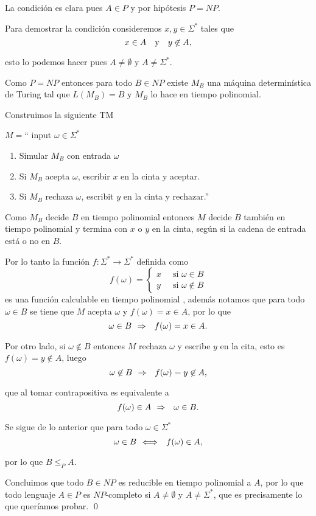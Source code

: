 \documentclass{article}
\begin{document}
La condición  es clara pues $A\in P$ y por hipótesis $P=NP$.

Para demostrar la condición  consideremos $x,y\in\Sigma^*$ tales que 
\[
    x\in A\quad\mbox{y}\quad y\not\in A,
\]

esto lo podemos hacer pues $A\neq\emptyset$ y $A\neq \Sigma^*$.

Como $P=NP$ entonces para todo $B\in NP$ existe $M_B$ una máquina determinística de Turing tal que $L(M_B)=B$ y $M_B$ lo hace en tiempo polinomial. 

Construimos la siguiente TM 

$M=$`` input $\omega\in \Sigma^*$
\begin{enumerate}
    \item Simular $M_B$ con entrada $\omega$
    \item Si $M_B$ acepta $\omega$, escribir $x$ en la cinta y aceptar.
    \item Si $M_B$ rechaza $\omega$, escribit $y$ en la cinta y rechazar.''
\end{enumerate}

Como $M_B$ decide $B$ en tiempo polinomial entonces $M$ decide $B$ también en tiempo polinomial y termina con $x$ o $y$ en la cinta, según si la cadena de entrada está o no en $B$.

Por lo tanto la función $f:\Sigma^*\rightarrow\Sigma^*$ definida como 
\[
    f(\omega)=\left\lbrace\begin{matrix}
        x&\ \text{ si }\omega\in B\\ 
        y&\ \text{ si }\omega\not\in B
    \end{matrix}\right.
\]
es una función calculable en tiempo polinomial \parencite[Ver][Definición 7.28]{sipser}, además notamos que para todo $\omega\in B$ se tiene que $M$ acepta $\omega$ y $f(\omega)=x\in A$, por lo que 
\[
    \omega\in B\mbox{$\ \ \Rightarrow\ \ $ } f(\omega)=x\in A.
\]

Por otro lado, si $\omega\not\in B$ entonces $M$ rechaza $\omega$ y escribe $y$ en la cita, esto es $f(\omega)=y\not\in A$, luego 
\[
    \omega\not\in B\mbox{$\ \ \Rightarrow\ \ $ } f(\omega)=y\not\in A,
\]

que al tomar contrapositiva es equivalente a
\[
    f(\omega)\in A\mbox{$\ \ \Rightarrow\ \ $ } \omega\in B.    
\]

Se sigue de lo anterior que para todo $\omega\in\Sigma^*$ 
\[
    \omega\in B\mbox{$\ \ \Longleftrightarrow\ \ $ } f(\omega)\in A,
\]

por lo que $B\leq_P A$. 

Concluimos que todo $B\in NP$ es reducible en tiempo polinomial a $A$, por lo que todo lenguaje $A\in P$ es $NP$-completo si $A\neq \emptyset$ y $A\neq \Sigma^*$, que es precisamente lo que queríamos probar. \qed

\clearpage
\nocite{*}
\printbibliography
\end{document}
